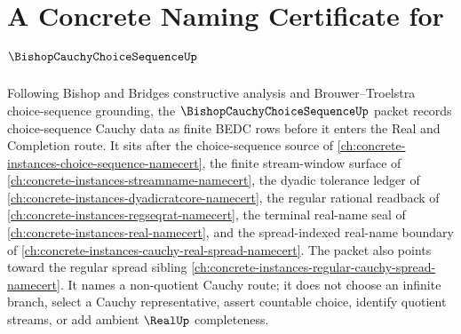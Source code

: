 \chapter{A Concrete Naming Certificate for $\BishopCauchyChoiceSequenceUp$}
\label{ch:concrete-instances-bishop-cauchy-choice-sequence-namecert}

Following Bishop and Bridges constructive analysis and Brouwer--Troelstra choice-sequence grounding, the $\BishopCauchyChoiceSequenceUp$ packet records choice-sequence Cauchy data as finite BEDC rows before it enters the Real and Completion route. It sits after the choice-sequence source of \autoref{ch:concrete-instances-choice-sequence-namecert}, the finite stream-window surface of \autoref{ch:concrete-instances-streamname-namecert}, the dyadic tolerance ledger of \autoref{ch:concrete-instances-dyadicratcore-namecert}, the regular rational readback of \autoref{ch:concrete-instances-regseqrat-namecert}, the terminal real-name seal of \autoref{ch:concrete-instances-real-namecert}, and the spread-indexed real-name boundary of \autoref{ch:concrete-instances-cauchy-real-spread-namecert}. The packet also points toward the regular spread sibling \autoref{ch:concrete-instances-regular-cauchy-spread-namecert}. It names a non-quotient Cauchy route; it does not choose an infinite branch, select a Cauchy representative, assert countable choice, identify quotient streams, or add ambient $\RealUp$ completeness.

